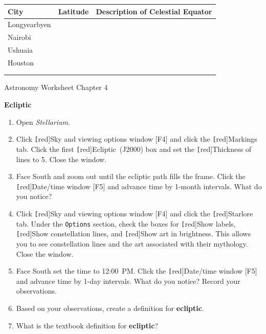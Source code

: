 \documentclass{article}
\newcounter{mycounter}
\begin{document}
\begin{center}
    \begin{tabular}{|p{2.5cm}|p{2cm}|p{10cm}|}
        \hline
        \textbf{City} & \textbf{Latitude} & \textbf{Description of Celestial Equator} \\
        \hline
        Longyearbyen & & \\[3em]
        \hline
        Nairobi & & \\[3em]
        \hline
        Ushuaia & & \\[3em]
        \hline
        Houston & & \\[3em]
        \hline
        & & \\[3em]
        \hline
        & & \\[3em]
        \hline
    \end{tabular}
\end{center}

\clearpage

Astronomy \hfill Worksheet \themycounter \hfill Chapter 4
\vspace{1em}


\textbf{Ecliptic}
\vspace{-1em}

\begin{enumerate}
\setlength\parskip{0pt}
    \item Open \textit{Stellarium}.
    \item Click \texttt[red]{Sky and viewing options window [F4]} and click the \texttt[red]{Markings} tab. Click the first \texttt[red]{Ecliptic~(J2000)} box and set the \texttt[red]{Thickness} of lines to 5. Close the window. 
    \item Face South and zoom out until the ecliptic path fills the frame. Click the  \texttt[red]{Date/time window [F5]} and advance time by 1-month intervals. What do you notice?
    \item Click \texttt[red]{Sky and viewing options window [F4]} and click the \texttt[red]{Starlore} tab. Under the \texttt{Options} section, check the boxes for \texttt[red]{Show labels}, \texttt[red]{Show constellation lines}, and \texttt[red]{Show art in brightness}. This allows you to see constellation lines and the art associated with their mythology. Close the window.
    \item Face South set the time to 12:00~PM. Click the  \texttt[red]{Date/time window [F5]} and advance time by 1-day intervals. What do you notice? Record your observations.
    \item Based on your observations, create a definition for \textbf{ecliptic}. 
    \item What is the textbook definition for \textbf{ecliptic}?
\end{enumerate}
\end{document}
